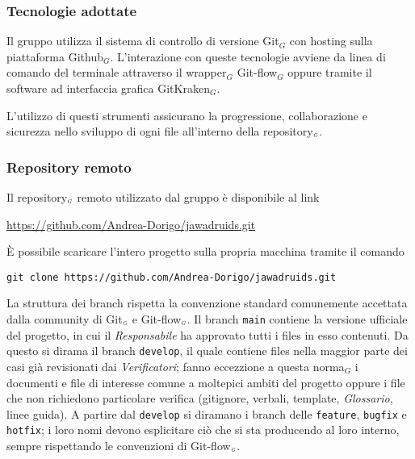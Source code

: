\subsubsection{Tecnologie adottate}\label{ProcessiDiSupportoGestioneDellaConfigurazioneVersionamentoTecnologieAdottate}
Il gruppo utilizza il sistema di controllo di versione Git$_G$ con hosting sulla piattaforma Github$_G$.
L'interazione con queste tecnologie avviene da linea di comando del terminale attraverso il wrapper$_G$ Git-flow$_G$ oppure tramite il software ad interfaccia grafica GitKraken$_G$.

L'utilizzo di questi strumenti assicurano la progressione, collaborazione e sicurezza nello sviluppo di ogni file all'interno della repository$_{\scaleto{G}{3pt}}$.
\subsubsection{Repository remoto}\label{ProcessiDiSupportoGestioneDellaConfigurazioneVersionamentoRepositoryRemoto}
Il repository$_{\scaleto{G}{3pt}}$ remoto utilizzato dal gruppo è disponibile al link
\begin{center}
 \url{https://github.com/Andrea-Dorigo/jawadruids.git}
\end{center}
È possibile scaricare l'intero progetto sulla propria macchina tramite il comando
\begin{center}
  \texttt{git clone https://github.com/Andrea-Dorigo/jawadruids.git}
\end{center}
La struttura dei branch rispetta la convenzione standard comunemente accettata dalla community di Git$_{\scaleto{G}{3pt}}$ e Git-flow$_{\scaleto{G}{3pt}}$. %
Il branch \texttt{main} contiene la versione ufficiale del progetto, in cui il \textit{Responsabile} ha approvato tutti i files in esso contenuti.
Da questo si dirama il branch \texttt{develop}, il quale contiene files nella maggior parte dei casi già revisionati dai \textit{Verificatori}; fanno eccezzione a questa norma$_G$ i documenti e file di interesse comune a moltepici ambiti del progetto oppure i file che non richiedono particolare verifica (gitignore, verbali, template, \textit{Glossario}, linee guida).
A partire dal \texttt{develop} si diramano i branch delle \texttt{feature}, \texttt{bugfix} e \texttt{hotfix}; i loro nomi devono esplicitare ciò che si sta producendo al loro interno, sempre rispettando le convenzioni di Git-flow$_{\scaleto{G}{3pt}}$.

